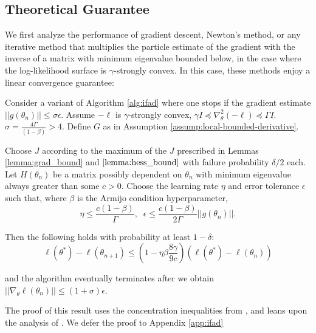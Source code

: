 \documentclass{article}
\begin{document}
\subsection{Theoretical Guarantee}

We first analyze the performance of gradient descent, Newton's method, or any iterative method that multiplies the particle estimate of the gradient with the inverse of a matrix with minimum eigenvalue bounded below, in the case where the log-likelihood surface is $\gamma$-strongly convex. In this case, these methods enjoy a linear convergence guarantee:

\begin{thm}
\label{thm:convergence}

Consider a variant of Algorithm \ref{alg:ifad} where one stops if the gradient estimate $||g(\theta_n)|| \leq \sigma \epsilon$. Assume $-\ell$ is $\gamma$-strongly convex, $\gamma I \preceq \nabla_\theta^2 (-\ell) \preceq \Gamma I$. $\sigma = \frac{4 \Gamma}{(1-\beta)}> 4$. Define $G$ as in Assumption \ref{assump:local-bounded-derivative}.

Choose $J$ according to the maximum of the $J$ prescribed in Lemmas \ref{lemma:grad_bound} and $\ref{lemma:hess_bound}$ with failure probability $\delta/2$ each. Let $H(\theta_n)$ be a matrix possibly dependent on $\theta_n$ with minimum eigenvalue always greater than some $c>0$. Choose the learning rate $\eta$ and error tolerance $\epsilon$ such that, where $\beta$ is the Armijo condition hyperparameter,
\begin{equation}
    \eta \leq \frac{c(1-\beta)}{\Gamma}, \;\; \epsilon \leq \frac{c(1-\beta)}{2\Gamma}||g(\theta_n)||.
\end{equation}

Then the following holds with probability at least $1-\delta$:
\begin{equation}
\ell(\theta^*) - \ell(\theta_{n+1}) \leq \left(1-\eta\beta\frac{8\gamma}{9c}\right)(\ell(\theta^*)-\ell(\theta_n))
\end{equation}

and the algorithm eventually terminates after we obtain $||\nabla_\theta \ell(\theta_n)|| \leq (1+\sigma) \epsilon$.
\end{thm}

The proof of this result uses the concentration inequalities from \cite{delmoral2011ci}, and leans upon the analysis of \cite{mahoney2016subsampled}. We defer the proof to Appendix \ref{app:ifad}
\end{document}
